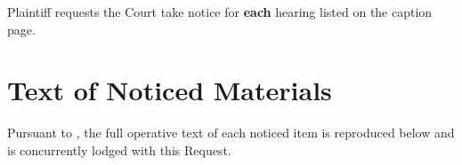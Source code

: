 Plaintiff requests the Court take notice for \textbf{each} hearing listed on the caption page.

\section*{Text of Noticed Materials}

Pursuant to , the full operative text of each noticed item is reproduced below and is concurrently lodged with this Request.





